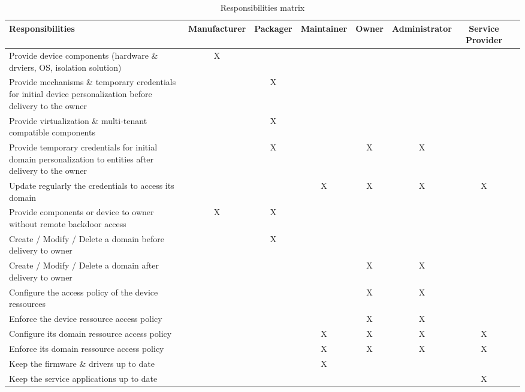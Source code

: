 \documentclass[conference]{IEEEtran}
\begin{document}
\begin{table}[!ht]
\renewcommand{\arraystretch}{1.3}
\caption{Responsibilities matrix}
\label{tab:resp_table}
\centering
\begin{tabular}{|p{7cm}||c|c|c|c|c|c|c|}
\hline
Responsibilities & Manufacturer & Packager & Maintainer & Owner & Administrator & Service Provider\\
\hline
Provide device components (hardware \& drviers, OS, isolation solution) & X & & & & &\\
\hline
Provide mechanisms \& temporary credentials for initial device personalization before delivery to the owner & & X & & & &\\
\hline
Provide virtualization \& multi-tenant compatible components & & X & & & &\\
\hline
Provide temporary credentials for initial domain personalization to entities after delivery to the owner & & X & & X & X & \\
\hline
Update regularly the credentials to access its domain & & & X & X & X & X\\
\hline
Provide components or device to owner without remote backdoor access & X & X & & & & \\
\hline
Create / Modify / Delete a domain before delivery to owner & & X & & & & \\
\hline
Create / Modify / Delete a domain after delivery to owner & & & & X & X & \\
\hline
Configure the access policy of the device ressources & & & & X & X & \\
\hline
Enforce the device ressource access policy & & & & X & X & \\
\hline
Configure its domain ressource access policy & & & X & X & X & X \\
\hline
Enforce its domain ressource access policy & & & X & X & X & X \\
\hline
Keep the firmware \& drivers up to date & & & X & & & \\
\hline
Keep the service applications up to date & & & & & & X \\
\hline
\end{tabular}
\end{table}
\end{document}
